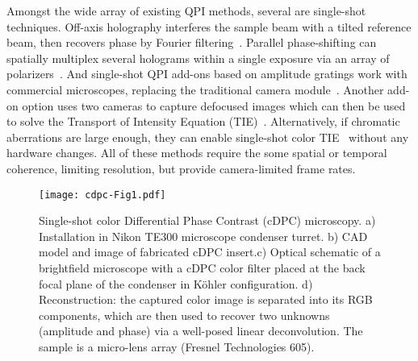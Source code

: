 Amongst the wide array of existing QPI methods, several are single-shot techniques. Off-axis holography interferes the sample beam with a tilted reference beam, then recovers phase by Fourier filtering~\cite{Witte:12}. Parallel phase-shifting can spatially multiplex several holograms within a single exposure via an array of polarizers~\cite{2004singleshotPSDH}. And single-shot QPI add-ons based on amplitude gratings work with commercial microscopes, replacing the traditional camera module~\cite{phasics,bon2012method}. Another add-on option uses two cameras to capture defocused images which can then be used to solve the Transport of Intensity Equation (TIE)~\cite{allman2005optical}. Alternatively, if chromatic aberrations are large enough, they can enable single-shot color TIE~\cite{5714248} without any hardware changes. All of these methods require the some spatial or temporal coherence, limiting resolution, but provide camera-limited frame rates.

\begin{figure}[tbh]
\centering
\texttt{[image: cdpc-Fig1.pdf]}
\caption{\label{fig:hardware}
Single-shot color Differential Phase Contrast (cDPC) microscopy. a) Installation in Nikon TE300 microscope condenser turret. b) CAD model and image of fabricated cDPC insert.c) Optical schematic of a brightfield microscope with a cDPC color filter placed at the back focal plane of the condenser in K\"{o}hler configuration. d) Reconstruction: the captured color image is separated into its RGB components, which are then used to recover two unknowns (amplitude and phase) via a well-posed linear deconvolution. The sample is a micro-lens array (Fresnel Technologies 605). }
\end{figure}

